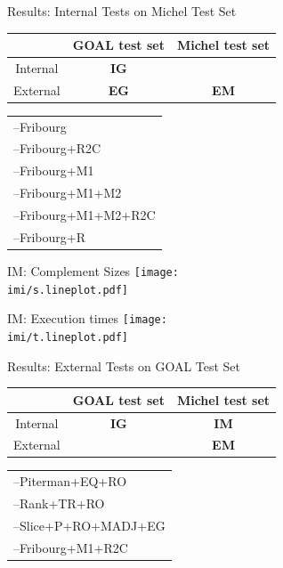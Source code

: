 \documentclass[12pt]{beamer}
\newcommand{\fat}[1]{\textbf{#1}}
\newcommand{\activecell}[1]{\cellcolor{red}\color{white}{#1}}
\newcommand{\imi}{../results/figures/internal/michel}
\newcommand{\myitem}{--\hspace*{\labelsep}}
\newcommand{\imil}{
\begin{tabular}{l}
\myitem Fribourg \\
\myitem Fribourg+R2C \\
\myitem Fribourg+M1 \\
\myitem Fribourg+M1+M2 \\
\myitem Fribourg+M1+M2+R2C \\
\myitem Fribourg+R \\
\end{tabular}}
\newcommand{\egol}{
\begin{tabular}{l}
\myitem Piterman+EQ+RO \\
\myitem Rank+TR+RO \\
\myitem Slice+P+RO+MADJ+EG \\
\myitem Fribourg+M1+R2C \\
\end{tabular}}
\begin{document}
\begin{frame}{Results: Internal Tests on Michel Test Set}
\begin{center}
{\renewcommand{\arraystretch}{1.25}
\begin{tabular}{c|c|c}
         & GOAL test set & Michel test set \\ \hline
Internal & \fat{IG}     & \activecell{\fat{IM}}        \\ \hline
External & \fat{EG}     &             \fat{EM}         \\
\end{tabular}}

\vspace{0.95cm}
\imil
\end{center}
\end{frame}

\begin{frame}{IM: Complement Sizes}
\centering
\texttt{[image: \\imi/s.lineplot.pdf]}
\end{frame}

\begin{frame}{IM: Execution times}
\centering
\texttt{[image: \\imi/t.lineplot.pdf]}
\end{frame}

\begin{frame}{Results: External Tests on GOAL Test Set}
\begin{center}
{\renewcommand{\arraystretch}{1.25}
\begin{tabular}{c|c|c}
         & GOAL test set & Michel test set \\ \hline
Internal & \fat{IG}                  & \fat{IM}        \\ \hline
External & \activecell{\fat{EG}}     & \fat{EM}        \\
\end{tabular}}

\vspace{1.4cm}
\egol
\end{center}
\end{frame}
\end{document}
